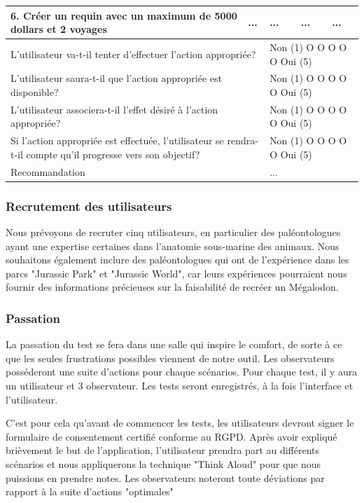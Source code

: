 \documentclass{article}
\begin{document}
\begin{table}[h]
\begin{tabular}{|p{6cm}|p{1.5cm}|p{1.5cm}|p{2.5cm}|p{3.5cm}|}
\textbf{6. Créer un requin avec un maximum de 5000 dollars et 2 voyages} & ... & ... & ... & ... \\ \hline
\multicolumn{2}{|p{7.5cm}|}{L’utilisateur va-t-il tenter d’effectuer l’action appropriée?} & \multicolumn{3}{p{7.5cm}|}{Non (1) O O O O O Oui (5)} \\ \hline
\multicolumn{2}{|p{7.5cm}|}{L’utilisateur saura-t-il que l’action appropriée est disponible?} & \multicolumn{3}{p{7.5cm}|}{Non (1) O O O O O Oui (5)} \\ \hline
\multicolumn{2}{|p{7.5cm}|}{L’utilisateur associera-t-il l’effet désiré à l’action appropriée?} & \multicolumn{3}{p{7.5cm}|}{Non (1) O O O O O Oui (5)} \\ \hline
\multicolumn{2}{|p{7.5cm}|}{Si l’action appropriée est effectuée, l’utilisateur se rendra-t-il compte qu’il progresse vers son objectif?} & \multicolumn{3}{p{7.5cm}|}{Non (1) O O O O O Oui (5)} \\ \hline
\multicolumn{2}{|p{7.5cm}|}{Recommandation} & \multicolumn{3}{p{7.5cm}|}{...} \\ \hline
\end{tabular}
\end{table}

\clearpage
\subsubsection{Recrutement des utilisateurs}
Nous prévoyons de recruter cinq utilisateurs, en particulier des paléontologues ayant une expertise certaines dans l'anatomie sous-marine des animaux. Nous souhaitons également inclure des paléontologues qui ont de l'expérience dans les parcs "Jurassic Park" et "Jurassic World", car leurs expériences pourraient nous fournir des informations précieuses sur la faisabilité de recréer un Mégalodon.

\subsubsection{Passation}
La passation du test se fera dans une salle qui inspire le comfort, de sorte à ce que les seules frustrations possibles viennent de notre outil. Les observateurs posséderont une suite d'actions pour chaque scénarios. Pour chaque test, il y aura un utilisateur et 3 observateur. Les tests seront enregistrés, à la fois l'interface et l'utilisateur.

C'est pour cela qu'avant de commencer les tests, les utilisateurs devront signer le formulaire de consentement certifié conforme au RGPD. Après avoir expliqué brièvement le but de l'application, l'utilisateur prendra part au différents scénarios et nous appliquerons la technique "Think Aloud" pour que nous puissions en prendre notes.
Les observateurs noteront toute déviations par rapport à la suite d'actions "optimales"
\end{document}
